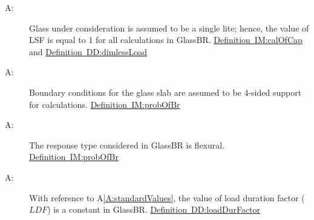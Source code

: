 \documentclass[12pt]{article}
\newcounter{assumpnum}
\newcommand{\atheassumpnum}{A\theassumpnum}
\begin{document}
\begin{description}
\item[\atheassumpnum\label{A:glassLite}:]Glass under consideration is assumed to be a single lite; hence, the value of LSF is equal to 1 for all calculations in GlassBR. \hyperref[IM:calOfCap]{Definition~IM:calOfCap} and \hyperref[DD:dimlessLoad]{Definition~DD:dimlessLoad}
\end{description}
\begin{description}
\item[\atheassumpnum\label{A:boundaryConditions}:]Boundary conditions for the glass slab are assumed to be 4-sided support for calculations. \hyperref[IM:probOfBr]{Definition~IM:probOfBr}
\end{description}
\begin{description}
\item[\atheassumpnum\label{A:responseType}:]The response type considered in GlassBR is flexural. \hyperref[IM:probOfBr]{Definition~IM:probOfBr}
\end{description}
\begin{description}
\item[\atheassumpnum\label{A:ldfConstant}:]With reference to A\ref{A:standardValues}, the value of load duration factor ($LDF$) is a constant in GlassBR. \hyperref[DD:loadDurFactor]{Definition~DD:loadDurFactor}
\end{description}
\end{document}
